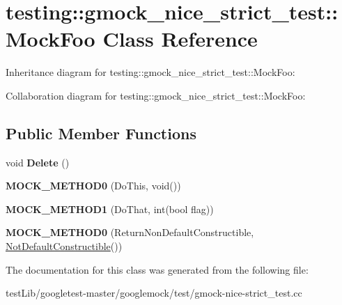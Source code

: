 \hypertarget{classtesting_1_1gmock__nice__strict__test_1_1MockFoo}{}\section{testing\+:\+:gmock\+\_\+nice\+\_\+strict\+\_\+test\+:\+:Mock\+Foo Class Reference}
\label{classtesting_1_1gmock__nice__strict__test_1_1MockFoo}


Inheritance diagram for testing\+:\+:gmock\+\_\+nice\+\_\+strict\+\_\+test\+:\+:Mock\+Foo\+:


Collaboration diagram for testing\+:\+:gmock\+\_\+nice\+\_\+strict\+\_\+test\+:\+:Mock\+Foo\+:
\subsection*{Public Member Functions}
\begin{DoxyCompactItemize}
\item 
\mbox{\label{classtesting_1_1gmock__nice__strict__test_1_1MockFoo_a7bdec6a6353e4396d551dbf8f2beac54}} 
void {\bfseries Delete} ()
\item 
\mbox{\label{classtesting_1_1gmock__nice__strict__test_1_1MockFoo_a14ee661ebc461096824e876a9308840e}} 
{\bfseries M\+O\+C\+K\+\_\+\+M\+E\+T\+H\+O\+D0} (Do\+This, void())
\item 
\mbox{\label{classtesting_1_1gmock__nice__strict__test_1_1MockFoo_a3a7bfcf303a2c8578db900c9525b02a1}} 
{\bfseries M\+O\+C\+K\+\_\+\+M\+E\+T\+H\+O\+D1} (Do\+That, int(bool flag))
\item 
\mbox{\label{classtesting_1_1gmock__nice__strict__test_1_1MockFoo_a2d69a27a8789f04938cb1eb0047bb677}} 
{\bfseries M\+O\+C\+K\+\_\+\+M\+E\+T\+H\+O\+D0} (Return\+Non\+Default\+Constructible, \hyperlink{classtesting_1_1gmock__nice__strict__test_1_1NotDefaultConstructible}{Not\+Default\+Constructible}())
\end{DoxyCompactItemize}


The documentation for this class was generated from the following file\+:\begin{DoxyCompactItemize}
\item 
test\+Lib/googletest-\/master/googlemock/test/gmock-\/nice-\/strict\+\_\+test.\+cc\end{DoxyCompactItemize}
